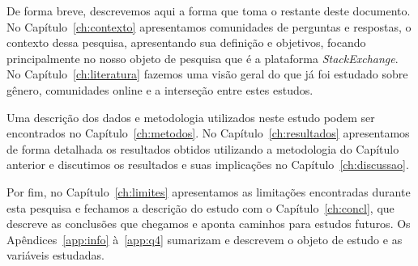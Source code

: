 De forma breve, descrevemos aqui a forma que toma o restante deste documento. No Capítulo~\ref{ch:contexto} apresentamos comunidades de perguntas e respostas, o contexto dessa pesquisa, apresentando sua definição e objetivos, focando principalmente no nosso objeto de pesquisa que é a plataforma \emph{StackExchange}. No Capítulo~\ref{ch:literatura} fazemos uma visão geral do que já foi estudado sobre gênero, comunidades online e a interseção entre estes estudos.

Uma descrição dos dados e metodologia utilizados neste estudo podem ser encontrados no Capítulo~\ref{ch:metodos}. No Capítulo~\ref{ch:resultados} apresentamos de forma detalhada os resultados obtidos utilizando a metodologia do Capítulo anterior e discutimos os resultados e suas implicações no Capítulo~\ref{ch:discussao}.

Por fim, no Capítulo~\ref{ch:limites} apresentamos as limitações encontradas durante esta pesquisa e fechamos a descrição do estudo com o Capítulo~\ref{ch:concl}, que descreve as conclusões que chegamos e aponta caminhos para estudos futuros. Os Apêndices~\ref{app:info} à~\ref{app:q4} sumarizam e descrevem o objeto de estudo e as variáveis estudadas.



